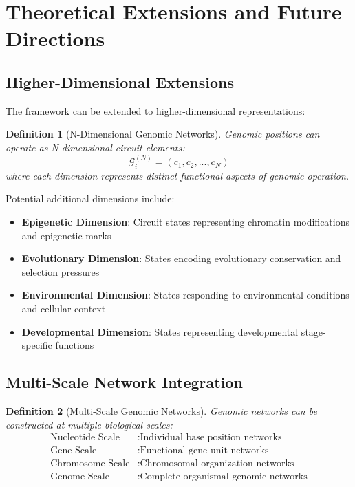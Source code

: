 \documentclass[12pt,a4paper]{article}
\newtheorem{definition}{Definition}
\begin{document}
\section{Theoretical Extensions and Future Directions}

\subsection{Higher-Dimensional Extensions}

The framework can be extended to higher-dimensional representations:

\begin{definition}[N-Dimensional Genomic Networks]
Genomic positions can operate as N-dimensional circuit elements:
\begin{equation}
\mathcal{G}_i^{(N)} = (c_1, c_2, ..., c_N)
\end{equation}
where each dimension represents distinct functional aspects of genomic operation.
\end{definition}

Potential additional dimensions include:
\begin{itemize}
\item \textbf{Epigenetic Dimension}: Circuit states representing chromatin modifications and epigenetic marks
\item \textbf{Evolutionary Dimension}: States encoding evolutionary conservation and selection pressures  
\item \textbf{Environmental Dimension}: States responding to environmental conditions and cellular context
\item \textbf{Developmental Dimension}: States representing developmental stage-specific functions
\end{itemize}

\subsection{Multi-Scale Network Integration}

\begin{definition}[Multi-Scale Genomic Networks]
Genomic networks can be constructed at multiple biological scales:
\begin{align}
\text{Nucleotide Scale} &: \text{Individual base position networks} \\
\text{Gene Scale} &: \text{Functional gene unit networks} \\  
\text{Chromosome Scale} &: \text{Chromosomal organization networks} \\
\text{Genome Scale} &: \text{Complete organismal genomic networks}
\end{align}
\end{definition}
\end{document}

